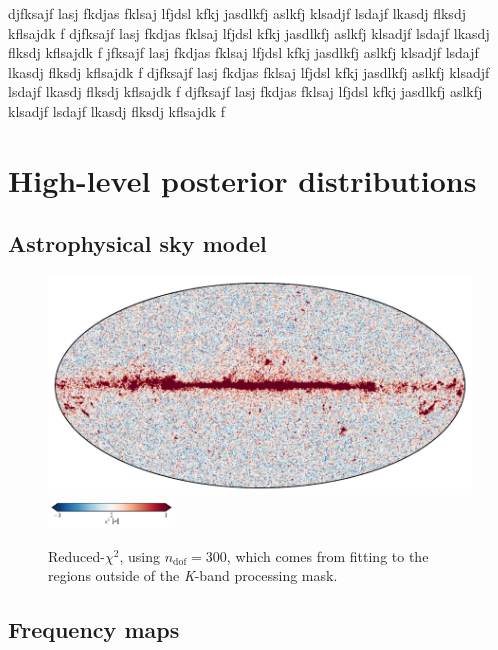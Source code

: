 \documentclass[twocolumn]{../../common/aa}
\newcommand{\K}[0]{\textit K}
\begin{document}
djfksajf lasj fkdjas fklsaj lfjdsl kfkj jasdlkfj aslkfj klsadjf lsdajf lkasdj flksdj kflsajdk f
djfksajf lasj fkdjas fklsaj lfjdsl kfkj jasdlkfj aslkfj klsadjf lsdajf lkasdj flksdj kflsajdk f
jfksajf lasj fkdjas fklsaj lfjdsl kfkj jasdlkfj aslkfj klsadjf lsdajf lkasdj flksdj kflsajdk f
djfksajf lasj fkdjas fklsaj lfjdsl kfkj jasdlkfj aslkfj klsadjf lsdajf lkasdj flksdj kflsajdk f
djfksajf lasj fkdjas fklsaj lfjdsl kfkj jasdlkfj aslkfj klsadjf lsdajf lkasdj flksdj kflsajdk f


\clearpage

\section{High-level posterior distributions}
\label{sec:maps}

\subsection{Astrophysical sky model}
\label{sec:skymodel}

\begin{figure}
	\centering
	\includegraphics[width=\linewidth]{figures/chisq_IQU.pdf}
	\newline
	\includegraphics[width=0.3\textwidth]{figures/cbar_3sigma.pdf}
	\caption{Reduced-$\chi^2$, using $n_\mathrm{dof}=300$, which comes from fitting to the regions outside of the \K-band processing mask.}
\end{figure}


\clearpage
\subsection{Frequency maps}
\end{document}
